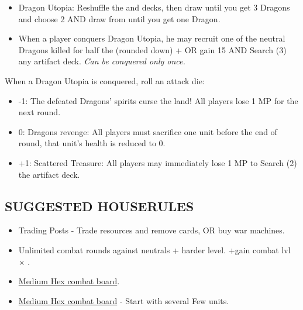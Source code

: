 \begin{multicols*}{2}
\begin{itemize}
  \item Dragon Utopia: Reshuffle the  and decks, then draw  until you get 3 Dragons and choose 2 AND draw from  until you get one Dragon. 
  \item When a player conquers Dragon Utopia, he may recruit one of the neutral Dragons killed for half the  (rounded down) +  OR gain 15  AND Search (3) any artifact deck. \textit{Can be conquered only once.}
\end{itemize}

When a Dragon Utopia is conquered, roll an attack die:
\begin{itemize}
  \item -1: The defeated Dragons’ spirits curse the land! All players lose 1 MP for the next round.
  \item  0: Dragons revenge: All players must sacrifice one unit before the end of round, that unit's health is reduced to 0. 
  \item +1: Scattered Treasure: All players may immediately lose 1 MP to Search (2) the artifact deck.
\end{itemize}

\subsection*{\MakeUppercase{Suggested houserules}}
\begin{itemize}
  \item Trading Posts - Trade resources and remove cards, OR buy war machines.
  \item Unlimited combat rounds against neutrals + harder level. +gain combat lvl × .
  \item \href{https://boardgamegeek.com/thread/3445901/custom-hex-combat-board}{Medium Hex combat board}.
  \item \href{https://boardgamegeek.com/thread/3449937/houserule-for-stacking-more-than-pack}{Medium Hex combat board} - Start with several Few  units.
\end{itemize}

\vspace*{\fill}

\begin{center}
\end{center}

\vspace*{\fill}

\end{multicols*}

